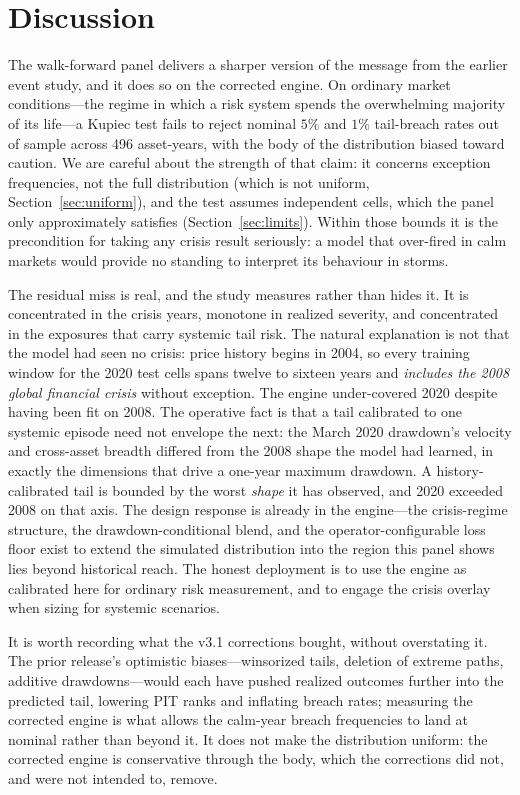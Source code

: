 \documentclass[11pt]{article}
\begin{document}
\section{Discussion}

The walk-forward panel delivers a sharper version of the message from the earlier
event study, and it does so on the corrected engine. On ordinary market
conditions---the regime in which a risk system spends the overwhelming majority of
its life---a Kupiec test fails to reject nominal $5\%$ and $1\%$ tail-breach rates
out of sample across 496 asset-years, with the body of the distribution biased
toward caution. We are careful about the strength of that claim: it concerns
exception frequencies, not the full distribution (which is not uniform,
Section~\ref{sec:uniform}), and the test assumes independent cells, which the
panel only approximately satisfies (Section~\ref{sec:limits}). Within those
bounds it is the precondition for taking any crisis result seriously: a model that
over-fired in calm markets would provide no standing to interpret its behaviour in
storms.

The residual miss is real, and the study measures rather than hides it. It is
concentrated in the crisis years, monotone in realized severity, and concentrated
in the exposures that carry systemic tail risk. The natural explanation is not
that the model had seen no crisis: price history begins in 2004, so every
training window for the 2020 test cells spans twelve to sixteen years and
\emph{includes the 2008 global financial crisis} without exception. The engine
under-covered 2020 despite having been fit on 2008. The operative fact is that a
tail calibrated to one systemic episode need not envelope the next: the March 2020
drawdown's velocity and cross-asset breadth differed from the 2008 shape the model
had learned, in exactly the dimensions that drive a one-year maximum drawdown. A
history-calibrated tail is bounded by the worst \emph{shape} it has observed, and
2020 exceeded 2008 on that axis. The design response is already in the
engine---the crisis-regime structure, the drawdown-conditional blend, and the
operator-configurable loss floor exist to extend the simulated distribution into
the region this panel shows lies beyond historical reach. The honest deployment is
to use the engine as calibrated here for ordinary risk measurement, and to engage
the crisis overlay when sizing for systemic scenarios.

It is worth recording what the v3.1 corrections bought, without overstating it.
The prior release's optimistic biases---winsorized tails, deletion of extreme
paths, additive drawdowns---would each have pushed realized outcomes further into
the predicted tail, lowering PIT ranks and inflating breach rates; measuring the
corrected engine is what allows the calm-year breach frequencies to land at
nominal rather than beyond it. It does not make the distribution uniform: the
corrected engine is conservative through the body, which the corrections did not,
and were not intended to, remove.
\end{document}
